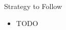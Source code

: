 \begin{frame}{Strategy to Follow}
\begin{itemize}
\item TODO
\end{itemize}
\end{frame}
















